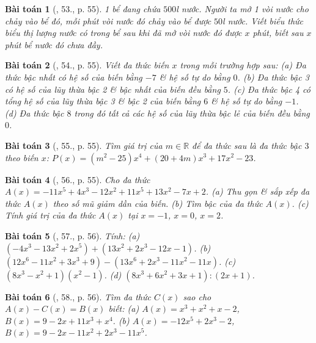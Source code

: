 \documentclass{article}
\newtheorem{baitoan}{Bài toán}
\begin{document}
\begin{baitoan}[\cite{SBT_Toan_7_Canh_Dieu_tap_2}, 53., p. 55]
	1 bể đang chứa $500$\emph{l} nước. Người ta mở 1 vòi nước cho chảy vào bể đó, mỗi phút vòi nước đó chảy vào bể được $50$\emph{l} nước. Viết biểu thức biểu thị lượng nước có trong bể sau khi đã mở vòi nước đó được $x$ phút, biết sau $x$ phút bể nước đó chưa đầy.
\end{baitoan}

\begin{baitoan}[\cite{SBT_Toan_7_Canh_Dieu_tap_2}, 54., p. 55]
	Viết đa thức biến $x$ trong mỗi trường hợp sau: (a) Đa thức bậc nhất có hệ số của biến bằng $-7$ \& hệ số tự do bằng $0$. (b) Đa thức bậc 3 có hệ số của lũy thừa bậc 2 \& bậc nhất của biến đều bằng $5$. (c) Đa thức bậc 4 có tổng hệ số của lũy thừa bậc 3 \& bậc 2 của biến bằng $6$ \& hệ số tự do bằng $-1$. (d) Đa thức bậc $8$ trong đó tất cả các hệ số của lũy thừa bậc lẻ của biến đều bằng $0$.
\end{baitoan}

\begin{baitoan}[\cite{SBT_Toan_7_Canh_Dieu_tap_2}, 55., p. 55]
	Tìm giá trị của $m\in\mathbb{R}$ để đa thức sau là đa thức bậc $3$ theo biến $x$: $P(x) = (m^2 - 25)x^4 + (20 + 4m)x^3 + 17x^2 - 23$.
\end{baitoan}

\begin{baitoan}[\cite{SBT_Toan_7_Canh_Dieu_tap_2}, 56., p. 55]
	Cho đa thức $A(x) = -11x^5 + 4x^3 - 12x^2 + 11x^5 + 13x^2 - 7x + 2$. (a) Thu gọn \& sắp xếp đa thức $A(x)$ theo số mũ giảm dần của biến. (b) Tìm bậc của đa thức $A(x)$. (c) Tính giá trị của đa thức $A(x)$ tại $x = -1$, $x = 0$, $x = 2$.
\end{baitoan}

\begin{baitoan}[\cite{SBT_Toan_7_Canh_Dieu_tap_2}, 57., p. 56]
	Tính: (a) $(-4x^3 - 13x^2 + 2x^5) + (13x^2 + 2x^3 - 12x - 1)$. (b) $(12x^6 - 11x^2 + 3x^3 + 9) - (13x^6 + 2x^3 - 11x^2 - 11x)$. (c) $(8x^3 - x^2 + 1)(x^2 - 1)$. (d) $(8x^3 + 6x^2 + 3x + 1):(2x + 1)$.
\end{baitoan}

\begin{baitoan}[\cite{SBT_Toan_7_Canh_Dieu_tap_2}, 58., p. 56]
	Tìm đa thức $C(x)$ sao cho $A(x) - C(x) = B(x)$ biết: (a) $A(x) = x^3 + x^2 + x - 2$, $B(x) = 9 - 2x + 11x^3 + x^4$. (b) $A(x) = -12x^5 + 2x^3 - 2$, $B(x) = 9 - 2x - 11x^2 + 2x^3 - 11x^5$.
\end{baitoan}
\end{document}

